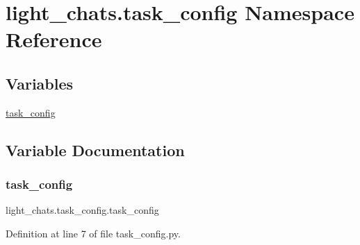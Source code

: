 \hypertarget{namespacelight__chats_1_1task__config}{}\section{light\+\_\+chats.\+task\+\_\+config Namespace Reference}
\label{namespacelight__chats_1_1task__config}
\subsection*{Variables}
\begin{DoxyCompactItemize}
\item 
\hyperlink{namespacelight__chats_1_1task__config_a96e7659d07c3ce042a9c4a275af26778}{task\+\_\+config}
\end{DoxyCompactItemize}


\subsection{Variable Documentation}
\mbox{\label{namespacelight__chats_1_1task__config_a96e7659d07c3ce042a9c4a275af26778}} 
\subsubsection{\texorpdfstring{task\+\_\+config}{task\_config}}
{\footnotesize\ttfamily light\+\_\+chats.\+task\+\_\+config.\+task\+\_\+config}



Definition at line 7 of file task\+\_\+config.\+py.

